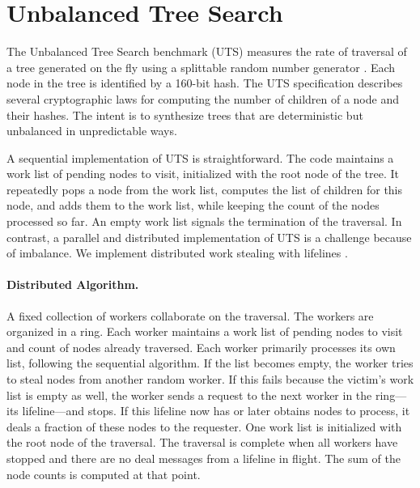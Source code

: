 \section{Unbalanced Tree Search}
\label{sec:uts}

The Unbalanced Tree Search benchmark (UTS) measures the rate of traversal of
a tree generated on the fly using a splittable random number
generator \cite{lcpc06}. Each node in the tree is identified by a 160-bit hash.
The UTS specification describes several cryptographic laws for computing the number of children of a node and their hashes.
The intent is to synthesize trees that are deterministic but unbalanced in unpredictable ways. 

A sequential implementation of UTS is straightforward. The code maintains a work list of pending nodes to visit, initialized with the root node of the tree. It repeatedly pops a node from the work list, computes the list of children for this node, and adds them to the work list, while keeping the count of the nodes processed so far. An empty work list signals the termination of the traversal.
In contrast, a parallel and distributed implementation of UTS is a challenge because of imbalance.
We implement distributed work stealing with lifelines \cite{ppopp11}.

\paragraph{Distributed Algorithm.} A fixed collection of workers collaborate on the traversal. The workers are organized in a ring.
Each worker maintains a work list of pending nodes to visit and count of nodes already traversed. Each worker primarily processes its own list, following the sequential algorithm. If the list becomes empty, the worker tries to steal nodes from another random worker. If this fails because the victim's work list is empty as well, the worker sends a request to the next worker in the ring---its lifeline---and stops. If this lifeline now has or later obtains nodes to process, it deals a fraction of these nodes to the requester. One work list is initialized with the root node of the traversal. The traversal is complete when all workers have stopped and there are no deal messages from a lifeline in flight. The sum of the node counts is computed at that point.

